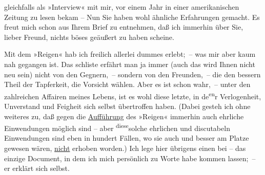                gleichfalls als »Interview« mit mir, vor einem Jahr in einer amerikanischen Zeitung zu lesen bekam – Nun Sie haben wohl
               ähnliche Erfahrungen gemacht. Es freut mich schon aus Ihrem Brief zu entnehmen, daß
               ich immerhin über {\pb}Sie, lieber Freund, nichts
               böses geäußert zu haben scheine.\pend
           
\pstart
           Mit dem »Reigen« hab ich freilich allerlei
               dummes erlebt; – was mir aber kaum nah gegangen ist. Das schli{\geminationm}ste erfährt man ja immer (auch das wird Ihnen nicht neu
               sein) nicht von den Gegnern, – sondern von den Freunden, – die den bessern Theil der
               Tapferkeit, die Vorsicht wählen. Aber es ist schon wahr, – unter den zahlreichen
               Affairen meines Lebens, ist es wohl diese letzte, in de\substVorne{}\textsuperscript{en}\substDazwischen{}r\substHinten{} Verlogenheit, Unverstand und Feigheit sich selbst übertroffen haben. (Dabei
               gesteh ich ohne weiteres zu, daß gegen die \uline{Aufführung}
               des »Reigen« immerhin auch ehrliche Einwendungen
               möglich sind – aber \substVorne{}\textsuperscript{diese}\substDazwischen{}solche\substHinten{} ehrlichen und discutabeln Einwendungen sind eben in hundert Fällen, wo sie
               auch und besser am Platze gewesen wären, \uline{nicht}
               erhoben worden.) Ich lege hier übrigens einen \label{K_L02376-2v}\label{K_L02376-2} bei – das einzige Document, in dem ich 
               mich \introOben{}persönlich\introOben{} zu Worte habe kommen lassen; – er erklärt
               sich selbst.\pend
           
